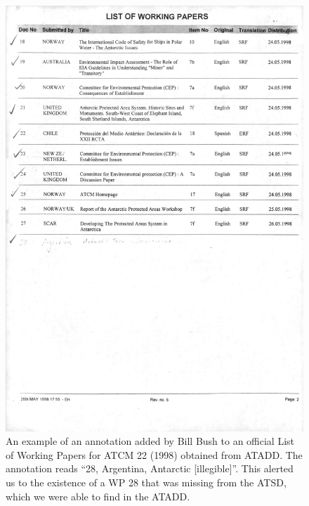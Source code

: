 \documentclass[12pt]{article}
\begin{document}
\begin{figure}[h]
    \begin{minipage}[b]{0.50\textwidth}
        \caption{
        An example of an annotation added by Bill Bush
        to an official List of Working Papers for ATCM 22 (1998) obtained from ATADD.
        The annotation reads ``28, Argentina, Antarctic [illegible]''.
        This alerted us to the existence of a WP 28 that was missing from the ATSD,
        which we were able to find in the ATADD.
        } \label{bush_annotation}
    \end{minipage}
    \hfill
    \begin{minipage}[b]{0.45\textwidth}
        \includegraphics[width=\textwidth]{figures/bush_annotation.png}
    \end{minipage}
\end{figure}
\end{document}
